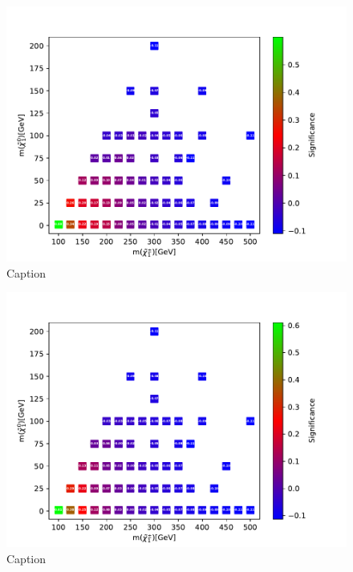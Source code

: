 \begin{figure}
    \centering
    \includegraphics[width = \textwidth]{Figures/Significances/significance_NN_WW_All_level.pdf}
    \caption{Caption}
    \label{fig:my_label}
\end{figure}

\begin{figure}
    \centering
    \includegraphics[width = \textwidth]{Figures/Significances/significance_NN_WW_Low_level.pdf}
    \caption{Caption}
    \label{fig:my_label}
\end{figure}


